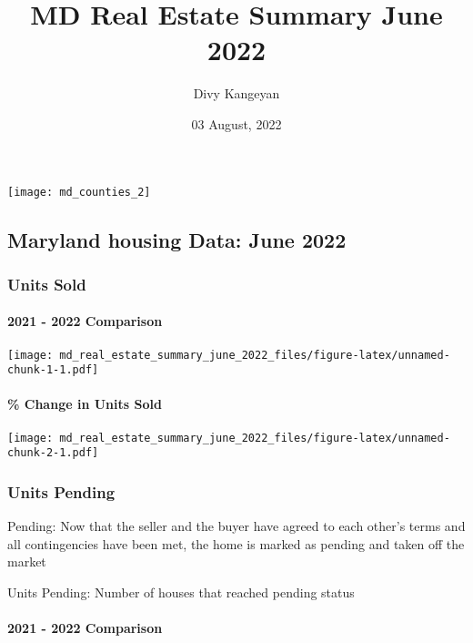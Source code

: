 \documentclass[
]{article}
\title{MD Real Estate Summary June 2022}
\author{Divy Kangeyan}
\date{03 August, 2022}
\begin{document}
\maketitle

\texttt{[image: md\_counties\_2]}

\hypertarget{maryland-housing-data-june-2022}{%
\subsection{Maryland housing Data: June
2022}\label{maryland-housing-data-june-2022}}

\hypertarget{units-sold}{%
\subsubsection{Units Sold}\label{units-sold}}

\newline
\newline
\newline
\newline

\hypertarget{comparison}{%
\paragraph{2021 - 2022 Comparison}\label{comparison}}

\texttt{[image: md\_real\_estate\_summary\_june\_2022\_files/figure-latex/unnamed-chunk-1-1.pdf]}

\hypertarget{change-in-units-sold}{%
\paragraph{\% Change in Units Sold}\label{change-in-units-sold}}

\texttt{[image: md\_real\_estate\_summary\_june\_2022\_files/figure-latex/unnamed-chunk-2-1.pdf]}

\hypertarget{units-pending}{%
\subsubsection{Units Pending}\label{units-pending}}

Pending: Now that the seller and the buyer have agreed to each other's
terms and all contingencies have been met, the home is marked as pending
and taken off the market

Units Pending: Number of houses that reached pending status

\hypertarget{comparison-1}{%
\paragraph{2021 - 2022 Comparison}\label{comparison-1}}
\end{document}
